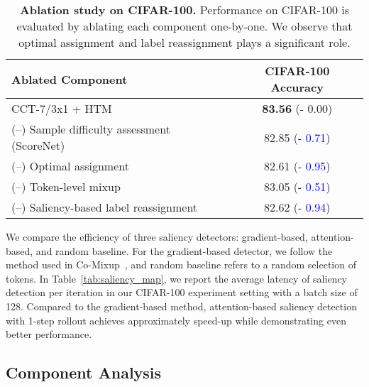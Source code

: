 \documentclass{article}
\begin{document}
\begin{table}[t]
    \centering
    \setlength{\tabcolsep}{3.5pt}
    \caption{\footnotesize\textbf{Ablation study on CIFAR-100.} Performance on CIFAR-100 is evaluated by ablating each component one-by-one. We observe that optimal assignment and label reassignment plays a significant role.}
    \vspace{-3mm}
        \begin{adjustbox}{width=0.7\textwidth}
    \footnotesize
    \begin{tabular}[t]{l | c}
    \toprule
    \textbf{Ablated Component} & \textbf{CIFAR-100 Accuracy} \\
    \midrule
    CCT-7/3x1 + HTM & \textbf{83.56} (- 0.00) \\
    \hspace{4mm}(--) Sample difficulty assessment (ScoreNet) & 82.85 (\textcolor{blue}{- 0.71}) \\
    \hspace{4mm}(--) Optimal assignment & 82.61 (\textcolor{blue}{- 0.95}) \\
    \hspace{4mm}(--) Token-level mixup & 83.05 (\textcolor{blue}{- 0.51}) \\
    \hspace{4mm}(--) Saliency-based label reassignment \hspace{10mm} & 82.62 (\textcolor{blue}{- 0.94}) \\
    \bottomrule
    \end{tabular}
    \end{adjustbox}
    \label{tab:ablation}
\end{table} \vspace{-3mm}
We compare the efficiency of three saliency detectors: gradient-based, attention-based, and random baseline.
For the gradient-based detector, we follow the method used in Co-Mixup~\cite{kim2021co}, and random baseline refers to a random selection of tokens.
In Table~\ref{tab:saliency_map}, we report the average latency of saliency detection per iteration in our CIFAR-100 experiment setting with a batch size of 128.
Compared to the gradient-based method, attention-based saliency detection with 1-step rollout achieves approximately  speed-up while demonstrating even better performance.
 \subsection{Component Analysis}
\end{document}
